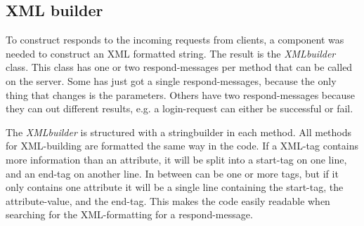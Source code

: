 \subsection{XML builder}
\label{sec:xmlbuilderimpl}
To construct responds to the incoming requests from clients, a component was needed to construct an XML formatted string. The result is the \textit{XMLbuilder} class. This class has one or two respond-messages per method that can be called on the server. Some has just got a single respond-messages, because the only thing that changes is the parameters. Others have two respond-messages because they can out different results, e.g. a login-request can either be successful or fail. 

The \textit{XMLbuilder} is structured with a stringbuilder in each method. All methods for XML-building are formatted the same way in the code. If a XML-tag contains more information than an attribute, it will be split into a start-tag on one line, and an end-tag on another line. In between can be one or more tags, but if it only contains one attribute it will be a single line containing the start-tag, the attribute-value, and the end-tag. This makes the code easily readable when searching for the XML-formatting for a respond-message. 